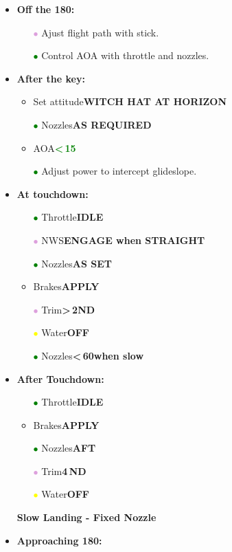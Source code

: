 \documentclass[a4paper,12pt,dvipsnames]{letter}
\newcommand{\button}[1]{\textbf{#1}}
\newcommand{\Deg}{\textdegree{}}
\newcommand{\ok}[1]{\textcolor{Green}{\textbf{#1}}}
\newcommand{\gi}{\textcolor{Green}{$\bullet$\;}}
\newcommand{\yi}{\textcolor{Yellow}{$\bullet$\;}}
\newcommand{\vi}{\textcolor{Plum}{$\bullet$\;}}
\begin{document}
{\begin{itemize}
\item \button{Off the 180:}
\begin{itemize}
 \item[\vi] Ajust flight path with stick.
 \item[\gi] Control AOA with throttle and nozzles.
\end{itemize}
\item \button{After the key:}
\begin{itemize}
 \item Set attitude\dotfill\button{WITCH HAT AT HORIZON}
 \item[\gi] Nozzles\dotfill\button{AS REQUIRED}
 \item AOA\dotfill\ok{<\,15\Deg}
 \item[\gi] Adjust power to intercept glideslope.
\end{itemize}
\item \button{At touchdown:}
\begin{itemize}
 \item[\gi] Throttle\dotfill\button{IDLE}
 \item[\vi] NWS\dotfill\button{ENGAGE when STRAIGHT}
 \item[\gi] Nozzles\dotfill\button{AS SET}
 \item Brakes\dotfill\button{APPLY}
 \item[\vi] Trim\dotfill\button{>\,2\Deg\;ND}
 \item[\yi] Water\dotfill\button{OFF}
 \item[\gi] Nozzles\dotfill\button{<\,60\Deg\;when slow}
\end{itemize}
\item \button{After Touchdown:}
\begin{itemize}
\item[\gi] Throttle\dotfill\button{IDLE}
\item Brakes\dotfill\button{APPLY}
\item[\gi] Nozzles\dotfill\button{AFT}
\item[\vi] Trim\dotfill\button{4\Deg\,ND}
\item[\yi] Water\dotfill\button{OFF}
\end{itemize}
\end{itemize}
\newpage
\begin{itemize}
\item[] {\LARGE\textbf{Slow Landing - Fixed Nozzle}}
\item \button{Approaching 180:}

\end{itemize}}
\end{document}
